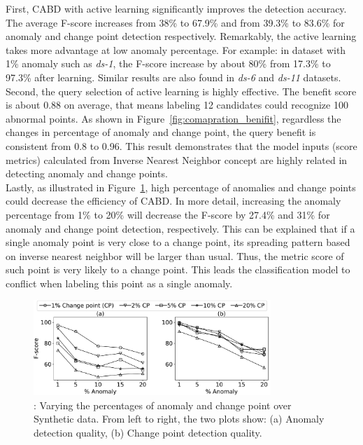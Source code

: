 First, CABD with active learning significantly improves the detection accuracy. The average F-score increases from 38\% to 67.9\% and from 39.3\% to 83.6\% for anomaly and change point detection respectively. Remarkably, the active learning takes more advantage at low anomaly percentage. For example: in dataset with 1\% anomaly such as \textit{ds-1}, the F-score increase by about 80\% from 17.3\% to 97.3\% after learning. Similar results are also found in \textit{ds-6} and \textit{ds-11} datasets. \\

Second, the query selection of active learning is highly effective. The benefit score is about 0.88 on average, that means labeling 12 candidates could recognize 100 abnormal points. As shown in Figure~\ref{fig:comapration_benifit}, regardless the changes in percentage of anomaly and change point, the query benefit is consistent from 0.8 to 0.96. This result demonstrates that the model inputs (score metrics) calculated from Inverse Nearest Neighbor concept are highly related in detecting anomaly and change points. \\

Lastly, as illustrated in Figure~\ref{fig:comapration_AC}, high percentage of anomalies and change points could decrease the efficiency of CABD. In more detail, increasing the anomaly percentage from 1\% to 20\% will decrease the F-score by 27.4\% and 31\% for anomaly and change point detection, respectively. This can be explained that if a single anomaly point is very close to a change point, its spreading pattern based on inverse nearest neighbor will be larger than usual. Thus, the metric score of such point is very likely to a change point. This leads the classification model to conflict when labeling this point as a single anomaly. 

\begin{figure}[h]
	\centering
	\includegraphics[width=0.8\textwidth]{Part3/Chapter7/figures/new_changeALpercentage.pdf}
	\caption{ : Varying the percentages of anomaly and change point over Synthetic data. From left to right, the two plots show:  (a) Anomaly detection quality, (b) Change point detection quality.}
	\label{fig:comapration_AC}
\end{figure}


